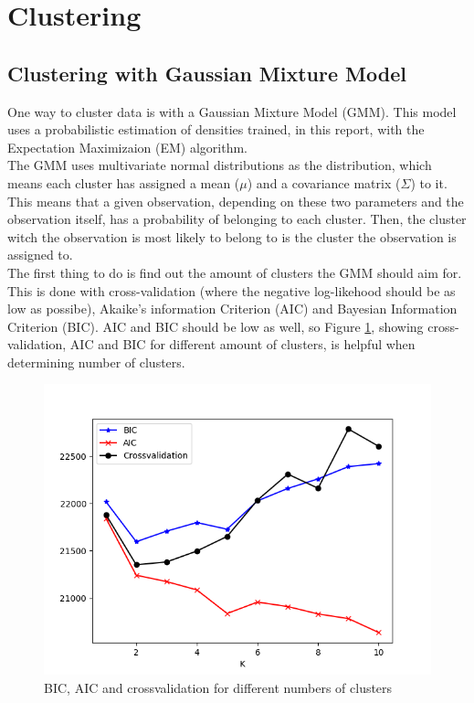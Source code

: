 \section{Clustering}


\subsection{Clustering with Gaussian Mixture Model}
One way to cluster data is with a Gaussian Mixture Model (GMM). This model uses a
probabilistic estimation of densities trained, in this report, with the
Expectation Maximizaion (EM) algorithm.\\
The GMM uses multivariate normal distributions as the distribution, which means
each cluster has assigned a mean ($\mu$) and a covariance matrix ($\Sigma$) to it.
This means that a given observation, depending on these two parameters and the
observation itself, has a probability of belonging to each cluster. Then, the
cluster witch the observation is most likely to belong to is the cluster the
observation is assigned to.\\
The first thing to do is find out the amount of clusters the GMM should aim for.
This is done with cross-validation (where the negative log-likehood should be
as low as possibe), Akaike's information Criterion (AIC) and Bayesian Information
Criterion (BIC). AIC and BIC should be low as well, so Figure \ref{cv}, showing
cross-validation, AIC and BIC for different amount of clusters, is helpful when
determining number of clusters.\\
\begin{figure}[htbp]
  \centering
  \includegraphics[width=\textwidth]{Figure_1.png}
  \caption{BIC, AIC and crossvalidation for different numbers of clusters}
  \label{cv}
\end{figure}
